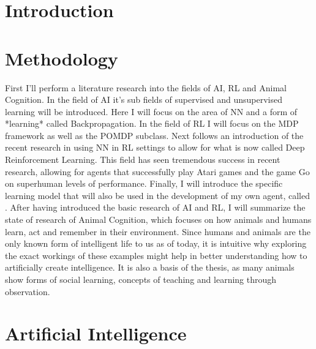 \chapter{Introduction}

\chapter{Methodology}

First I'll perform a literature research into the fields of \ac{AI}, \ac{RL} and Animal Cognition. In the field of AI it's sub fields of supervised and unsupervised learning will be introduced. Here I will focus on the area of \ac{NN} and a form of *learning* called Backpropagation. In the field of \ac{RL} I will focus on the \ac{MDP} framework as well as the \ac{POMDP} subclass. 
Next follows an introduction of the recent research in using \ac{NN} in \ac{RL} settings to allow for what is now called Deep Reinforcement Learning. This field has seen tremendous success in recent research, allowing for agents that successfully play 
Atari games and the game Go on superhuman levels of performance.
Finally, I will introduce the specific learning model that will also be used in the development of my own agent, called %
.
After having introduced the basic research of \ac{AI} and \ac{RL}, I will summarize the state of research of Animal Cognition, which focuses on how animals and humans learn, act and remember in their environment. Since humans and animals are the only known form of intelligent life to us as of today, it is intuitive why exploring the exact workings of these examples might help in better understanding how to artificially create intelligence. It is also a basis of the thesis, as many animals show forms of social learning, concepts of teaching and learning through observation.


\chapter{Artificial Intelligence}
